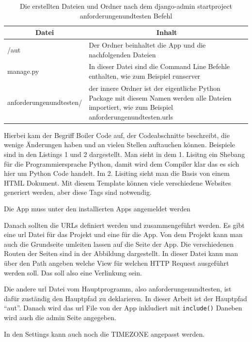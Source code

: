 \documentclass[11pt,a4paper]{report}
\begin{document}
\begin{table}
\centering
\begin{tabular}{|p{}|p{}|}
\hline
\multicolumn{1}{|c|}{\textbf{Datei}} & 
\multicolumn{1}{|c|}{\textbf{Inhalt}} \\\hline
/aut & Der Ordner beinhaltet die App und die nachfolgenden Dateien\\\hline
manage.py     & In dieser Datei sind die Command Line Befehle enthalten, wie zum Beispiel runserver \\\hline
anforderungenundtesten/    & der innere Ordner ist der eigentliche Python Package mit diesem Namen werden alle Dateien importiert, wie zum Beispiel anforderungenundtesten.urls \\\hline   
\end{tabular}
\caption{Die erstellten Dateien und Ordner nach dem django-admin startproject anforderungenundtesten Befehl}
\label{tab:AutoCode2}
\end{table}


Hierbei kam der Begriff Boiler Code auf, der Codeabschnitte beschreibt, die wenige Änderungen haben und an vielen Stellen auftauchen können. Beispiele sind in den Listings 1 und 2 dargestellt. Man sieht in dem 1. Lisitng ein Shebang für die Programmiersprache Python, damit wird dem Compiler klar das es sich hier um Python Code handelt. Im 2. Lisiting sieht man die Basis von einem HTML Dokument. Mit diesem Template können viele verschiedene Websites generiert werden, aber diese Tags sind notwendig. %

Die App muss unter den installierten Apps angemeldet werden

Danach sollten die URLs definiert werden und zusammengeführt werden. Es gibt eine url Datei für das Projekt und eine für die App. Von dem Projekt kann man auch die Grundseite umleiten lassen auf die Seite der App. Die verschiedenen Routen der Seiten sind in der Abbildung dargestellt. 
In dieser Datei kann man über den Path angeben welche View für welchen HTTP Request ausgeführt werden soll. Das soll also eine Verlinkung sein.

Die andere url Datei vom Hauptprogramm, also anforderungenundtesten, ist dafür zuständig den Hauptpfad zu deklarieren. In dieser Arbeit ist der Hauptpfad "`aut"'. Danach wird das url File von der App inkludiert mit \verb|include()| Daneben wird auch die admin Seite angegeben.

In den Settings kann auch noch die TIMEZONE angepasst werden. 
\end{document}
